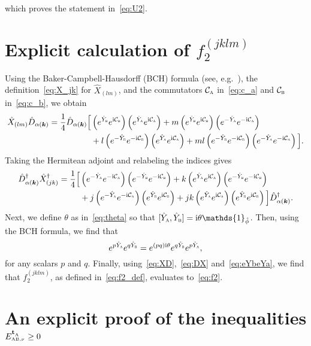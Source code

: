 \documentclass[pra,nofootinbib,floats,aps,twocolumn,tightenlines,superscriptaddress]{revtex4-1}
\newcommand{\ii}{\mathrm{i}}
\newcommand{\Ya}{\hat{Y}_\textsc{a}}
\newcommand{\Yb}{\hat{Y}_\textsc{b}}
\newcommand{\disp}{\hat{D}_{\alpha(\bm{k})}}
\newcommand{\ca}{\mathcal{C}_\textsc{a}}
\newcommand{\cb}{\mathcal{C}_\textsc{b}}
\begin{document}
which proves the statement in~\eqref{eq:U2}.







\section{Explicit calculation of \texorpdfstring{$f_2^{(jklm)}$}{}}
\label{Appendix:f2}

Using the Baker-Campbell-Hausdorff (BCH) formula (see, e.g.~\cite{Truax1988}), the definition~\eqref{eq:X_jk} for $\hat{X}_{(lm)}$, and the commutators $\ca$ in~\eqref{eq:c_a} and $\cb$ in~\eqref{eq:c_b}, we obtain
\begin{align}
\label{eq:XD}
    \hat{X}_{(lm)}\disp
    =
    \frac{1}{4}\disp
    \Big[
    &\left(e^{\Yb}e^{\ii\cb}\right)
    \left(e^{\Ya}e^{\ii\ca}\right)
    + m
    \left(e^{\Yb}e^{\ii\cb}\right)
    \left(e^{-\Ya}e^{-\ii\ca}\right)
    \notag\\
    &+ l
    \left(e^{-\Yb}e^{-\ii\cb}\right)
    \left(e^{\Ya}e^{\ii\ca}\right)
    + ml
    \left(e^{-\Yb}e^{-\ii\cb}\right)
    \left(e^{-\Ya}e^{-\ii\ca}\right)
    \Big].
\end{align}
Taking the Hermitean adjoint and relabeling the indices gives
\begin{align}
\label{eq:DX}
    \disp^\dagger\hat{X}_{(jk)}^\dagger
    =
    \frac{1}{4}
    \Big[
    &\left(e^{-\Ya}e^{-\ii\ca}\right)
    \left(e^{-\Yb}e^{-\ii\cb}\right)
    + k
    \left(e^{\Ya}e^{\ii\ca}\right)
    \left(e^{-\Yb}e^{-\ii\cb}\right)
    \notag\\
    &+ j
    \left(e^{-\Ya}e^{-\ii\ca}\right)
    \left(e^{\Yb}e^{\ii\cb}\right)
    + jk
    \left(e^{\Ya}e^{\ii\ca}\right)
    \left(e^{\Yb}e^{\ii\cb}\right)
    \Big]
    \disp^\dagger.
\end{align}
Next, we define $\theta$ as in~\eqref{eq:theta} so that $[\Ya,\Yb]=\ii\theta\mathds{1}_{\hat{\phi}}$. Then, using the BCH formula, we find that
\begin{equation}
\label{eq:eYbeYa}
    e^{p\Ya}e^{q\Yb}
    =
    e^{(pq)\ii\theta}
    e^{q\Yb}e^{p\Ya},
\end{equation}
for any scalars $p$ and $q$. Finally, using~\eqref{eq:XD},~\eqref{eq:DX} and~\eqref{eq:eYbeYa}, we find that $f_2^{(jklm)}$, as defined in~\eqref{eq:f2_def}, evaluates to~\eqref{eq:f2}.



\section{An explicit proof of the inequalities \texorpdfstring{$E_{_{\text{AB},\nu}}^{{\text{\textbf{t}}}_{_\text{A}}} \ge 0$}{}}
\label{Appendix:eigenvalues}
\end{document}
